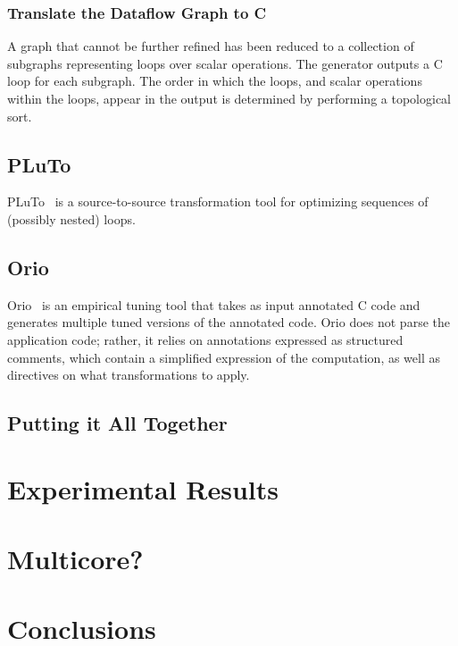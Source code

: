 \documentclass[11pt]{article}
\begin{document}
\subsubsection{Translate the Dataflow Graph to C}

A graph that cannot be further refined has been reduced to a collection of subgraphs representing loops over scalar operations. The generator outputs a C loop for each subgraph.  The order in which the loops, and scalar operations within the loops, appear in the output is determined by performing a topological sort.





\subsection{PLuTo}
\label{sec:plutonorio}

PLuTo~\cite{uday07tr70,uday08cc} is a source-to-source transformation tool for optimizing sequences of (possibly nested) loops.

\subsection{Orio}
\label{sec:orio}

Orio~\cite{Norris:2007} is an empirical tuning tool that takes as input annotated C code and generates multiple tuned versions of the annotated code. Orio does not parse the application code; rather, it relies on annotations expressed as structured comments, which contain a simplified expression of the computation, as well as directives on what transformations to apply.


\subsection{Putting it All Together}
\label{sec:combining}

\section{Experimental Results}
\label{sec:experiments}

\section{Multicore?}
\label{sec:multicore}

\section{Conclusions}



\end{document}
